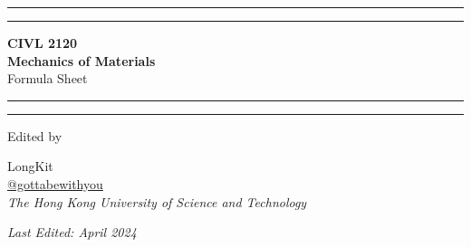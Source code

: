 \documentclass[twoside]{article}
\begin{document}
	
	\begin{titlepage}
		\centering
		\scshape
		\vspace*{\baselineskip}
		
		\rule{\textwidth}{1.6pt}\vspace*{-\baselineskip}\vspace*{2pt} %
		\rule{\textwidth}{0.4pt} %
		
		\vspace{0.5\baselineskip}
		
		{\LARGE \textbf{CIVL 2120 \\ Mechanics of Materials} \\
		
		\vspace{0.75\baselineskip}
		\Large Formula Sheet}
		
		\vspace{0.5\baselineskip} %
		
		\rule{\textwidth}{0.4pt}\vspace*{-\baselineskip}\vspace{3.2pt} %
		\rule{\textwidth}{1.6pt} %
		
		\vspace*{2\baselineskip} %
		
		{\Large Edited by
		
		\Large LongKit \\
		\vspace{7.5pt}
			\small \normalfont \href{https://github.com/gottabewithyou}{\faGithub \hspace{2.5pt} @gottabewithyou} \\
			\vspace{10pt}
			\large \textit{The Hong Kong University of Science and Technology}}
		
		\vspace{10\baselineskip}
		
		\textit{Last Edited: April 2024}
		
	\end{titlepage}
	
	\newpage
	
	\pagestyle{fancy}
	\fancyhf{}
	\renewcommand{\headrule}{%
		\vspace{1pt}\hrulefill
		\raisebox{-2.1pt}{\quad \floweroneleft \decotwo \floweroneright \quad}\hrulefill}
	
\end{document}
